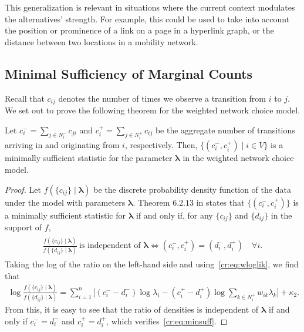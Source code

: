 This generalization is relevant in situations where the current context modulates the alternatives' strength.
For example, this could be used to take into account the position or prominence of a link on a page in a hyperlink graph, or the distance between two locations in a mobility network.


\subsection{Minimal Sufficiency of Marginal Counts}

Recall that $c_{ij}$ denotes the number of times we observe a transition from $i$ to $j$.
We set out to prove the following theorem for the weighted network choice model.

\begin{theorem}
Let $c^-_i = \sum_{j \in N^-_i} c_{ji}$ and $c^+_i = \sum_{j \in N^+_i} c_{ij}$ be the aggregate number of transitions arriving in and originating from $i$, respectively.
Then, $\{ (c^-_i, c^+_i) \mid i \in V \}$ is a minimally sufficient statistic for the parameter $\bm{\lambda}$ in the weighted network choice model.
\end{theorem}

\begin{proof}
Let $f(\{ c_{ij} \} \mid \bm{\lambda})$ be the discrete probability density function of the data under the model with parameters $\bm{\lambda}$.
Theorem $6.2.13$ in \citet{casella2002statistical} states that $\{ (c^-_i, c^+_i) \}$ is a minimally sufficient statistic for $\bm{\lambda}$ if and only if, for any $\{ c_{ij} \}$ and $\{ d_{ij} \}$ in the support of $f$,
\begin{align}
\label{cr:eq:minsuff}
\begin{aligned}
\frac{ f(\{ c_{ij} \} \mid \bm{\lambda}) }{ f(\{ d_{ij} \} \mid \bm{\lambda}) }\ \text{is independent of $\bm{\lambda}$}
\iff (c^-_i, c^+_i) = (d^-_i, d^+_i) \quad \forall i.
\end{aligned}
\end{align}
Taking the log of the ratio on the left-hand side and using~\eqref{cr:eq:wloglik}, we find that
\begin{align*}
\log \frac{ f(\{ c_{ij} \} \mid \bm{\lambda}) }{ f(\{ d_{ij} \} \mid \bm{\lambda}) } =
  \sum_{i = 1}^n \bigg[ (c^-_i\!-\!d^-_i) \log \lambda_i
                       - (c^+_i\!-\!d^+_i) \log\!\sum_{k \in N^+_i}\!w_{ik} \lambda_k \bigg] + \kappa_2.
\end{align*}
From this, it is easy to see that the ratio of densities is independent of $\bm{\lambda}$ if and only if $c^-_i = d^-_i$ and $c^+_i = d^+_i$, which verifies~\eqref{cr:eq:minsuff}.
\end{proof}

